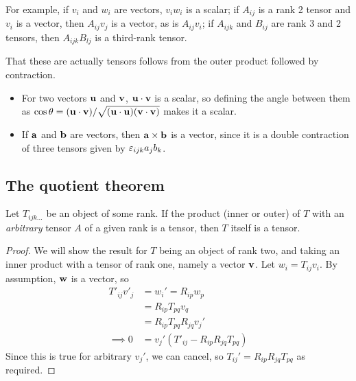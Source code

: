 \documentclass{../../template/note}
\begin{document}
    For example, if \(v_i\) and \(w_i\) are vectors, \(v_iw_i\) is a scalar; if \(A_{ij}\) is a rank 2 tensor and \(v_i\) is a vector, then \(A_{ij}v_j\) is a vector, as is \(A_{ij}v_i\); if \(A_{ijk}\) and \(B_{ij}\) are rank 3 and 2 tensors, then \(A_{ijk}B_{lj}\) is a third-rank tensor.

    That these are actually tensors follows from the outer product followed by contraction.

    \begin{example*}
        \begin{itemize}
            \item For two vectors \(\V u\) and \(\V v\), \(\V u \cdot \V v\) is a scalar, so defining the angle between them as \(\cos \theta = (\V u \cdot \V v)/\sqrt{(\V u \cdot \V u)(\V v \cdot \V v)}\) makes it a scalar.
            \item If \(\V a\) and \(\V b\) are vectors, then \(\V a \times \V b\) is a vector, since it is a double contraction of three tensors given by \(\varepsilon_{ijk}a_jb_k\).
        \end{itemize}
    \end{example*}
    
    \subsection{The quotient theorem}

    \begin{theorem*}
        \label{quot-thm}
        Let \(T_{ijk\dots}\) be an object of some rank. If the product (inner or outer) of \(T\) with an \emph{arbitrary} tensor \(A\) of a given rank is a tensor, then \(T\) itself is a tensor.
    \end{theorem*}
    

    \begin{proof}
        We will show the result for \(T\) being an object of rank two, and taking an inner product with a tensor of rank one, namely a vector \(\V v\). Let \(w_i = T_{ij}v_i\). By assumption, \(\V w\) is a vector, so
        \begin{align*}
            T'_{ij}v'_j &= w_i' = R_{ip}w_p \\
            &= R_{ip} T_{pq} v_q \\
            &= R_{ip} T_{pq} R_{jq} v_j' \\
            \implies 0 &= v_j'(T'_{ij} - R_{ip}R_{jq}T_{pq})
        \end{align*}
        Since this is true for arbitrary \(v_j'\), we can cancel, so \(T_{ij}' = R_{ip}R_{jq}T_{pq}\) as required.
    \end{proof}
    
\end{document}
